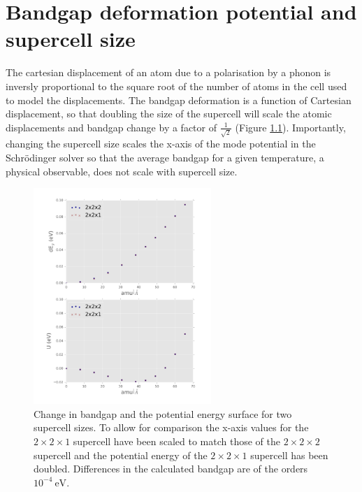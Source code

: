 \chapter{\label{app:6-SCcompare}Bandgap deformation potential and supercell size}

The cartesian displacement of an atom due to a polarisation by a phonon is inversly proportional to the square root of the number of atoms in the cell used to model the displacements.\autocite{Whalley2016} The bandgap deformation is a function of Cartesian displacement, so that doubling the size of the supercell will scale the atomic displacements and bandgap change by a factor of $\frac{1}{\sqrt{2}}$ (Figure \ref{ch5scaling}).  %
Importantly, changing the supercell size scales the x-axis of the mode potential in the Schr\"{o}dinger solver so that the average bandgap for a given temperature, a physical observable, does not scale with supercell size.

\begin{figure}[]
\includegraphics[width=0.6\textwidth]{figures/ch5/SCcompare.png} \centering
\caption[Bandgap deformation potential and supercell size]{\label{ch5scaling}
Change in bandgap and the potential energy surface for two supercell sizes. To allow for comparison the x-axis values for the $2\times2\times1$ supercell have been scaled to match those of the $2\times2\times2$ supercell and the potential energy of the $2\times2\times1$ supercell has been doubled.  Differences in the calculated bandgap are of the orders $10^{−4}\ \textrm{eV}$.
}
\end{figure}

